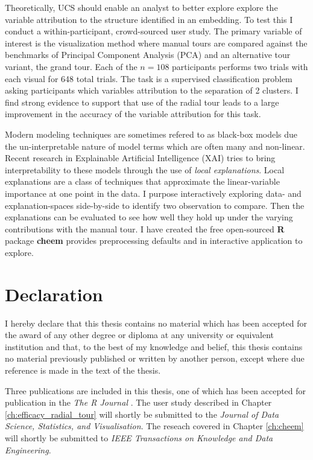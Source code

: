 \documentclass{template/monashthesis}
\begin{document}
Theoretically, UCS should enable an analyst to better explore explore the variable attribution to the structure identified in an embedding. To test this I conduct a within-participant, crowd-sourced user study. The primary variable of interest is the visualization method where manual tours are compared against the benchmarks of Principal Component Analysis (PCA) and an alternative tour variant, the grand tour. Each of the \(n=108\) participants performs two trials with each visual for 648 total trials. The task is a supervised classification problem asking participants which variables attribution to the separation of 2 clusters. I find strong evidence to support that use of the radial tour leads to a large improvement in the accuracy of the variable attribution for this task.

Modern modeling techniques are sometimes refered to as black-box models due the un-interpretable nature of model terms which are often many and non-linear. Recent research in Explainable Artificial Intelligence (XAI) tries to bring interpretability to these models through the use of \emph{local explanations}. Local explanations are a class of techniques that approximate the linear-variable importance at one point in the data. I purpose interactively exploring data- and explanation-spaces side-by-side to identify two observation to compare. Then the explanations can be evaluated to see how well they hold up under the varying contributions with the manual tour. I have created the free open-sourced \textbf{R} package \textbf{cheem} provides preprocessing defaults and in interactive application to explore.

\clearpage{}\setcounter{page}{0}

\hypertarget{declaration}{%
\chapter*{Declaration}\label{declaration}}

I hereby declare that this thesis contains no material which has been accepted for the award of any other degree or diploma at any university or equivalent institution and that, to the best of my knowledge and belief, this thesis contains no material previously published or written by another person, except where due reference is made in the text of the thesis.

Three publications are included in this thesis, one of which has been accepted for publication in the \emph{The R Journal} \autocite{spyrison_spinifex_2020}. The user study described in Chapter \ref{ch:efficacy_radial_tour} will shortly be submitted to the \emph{Journal of Data Science, Statistics, and Visualisation}. The reseach covered in Chapter \ref{ch:cheem} will shortly be submitted to \emph{IEEE Transactions on Knowledge and Data Engineering}.
\end{document}
